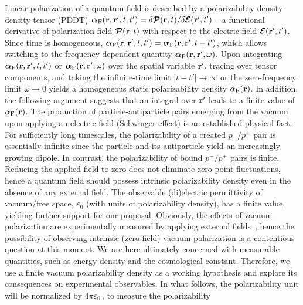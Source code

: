 \documentclass[aps,prl,twocolumn,showpacs,groupaddress]{revtex4-1}
\newcommand{\rrr}[1]{{\color{black}#1}}
\newcommand{\bbb}[1]{{\color{black}#1}}
\begin{document}
Linear polarization of a quantum field is described by a polarizability density-density tensor (PDDT) $\bm{\alpha}_{\rm F}({\bf r}, {\bf r'}, t, t') = \delta \bm{\mathcal{P}}({\bf r}, t) / \delta \bm{\mathcal{E}}({\bf r'}, t')$ -- a functional derivative of polarization field $\bm{\mathcal{P}}({\bf r},t)$ with respect to the electric field $\bm{\mathcal{E}}({\bf r'},t')$. 
\bbb{Since time is homogeneous, $\bm{\alpha}_{\rm F}({\bf r}, {\bf r'}, t, t') = \bm{\alpha}_{\rm F}({\bf r}, {\bf r'}, t-t')$, which allows switching to the frequency-dependent quantity $\bm{\alpha}_{\rm F}({\bf r}, {\bf r'}, \omega)$.}
Upon integrating $\bm{\alpha}_{\rm F}({\bf r}, {\bf r'}, t, t')$ \bbb{or $\bm{\alpha}_{\rm F}({\bf r}, {\bf r'}, \omega)$} over the spatial variable ${\bf r'}$, tracing over tensor components, and taking the infinite-time limit $|t-t'| \to \infty$ \bbb{or the zero-frequency limit $\omega \to 0$} yields a homogeneous static polarizability density $\alpha_{\rm F}({\bf r})$. 
In addition, the following argument suggests that an integral over ${\bf r'}$ leads to a finite value of $\alpha_{\rm F}({\bf r})$. 
\bbb{The production of particle-antiparticle pairs} emerging from the vacuum upon applying \bbb{an electric field \rrr{(Schwinger effect)} is} an established physical fact.
For sufficiently long timescales, the polarizability of \bbb{a created} $p^-/p^+$ pair is essentially infinite since the particle and its antiparticle yield an increasingly growing dipole.
\bbb{In contrast, the polarizability \bbb{of bound $p^-/p^+$ pairs is finite.}}
\rrr{Reducing} the applied field to zero does not eliminate zero-point fluctuations, hence a quantum field should possess intrinsic polarizability density even in the absence of any external field. The observable (di)electric permittivity of vacuum/free space,
$\varepsilon_0$ (with units of polarizability density), has a finite value, 
yielding further support for our proposal.
Obviously, the effects of vacuum polarization are experimentally \bbb{measured by applying} external fields~\cite{ScienceVacPol,Moskalenko2019,BeneaChelmus2019}, hence the possibility of observing intrinsic \bbb{(zero-field)} vacuum polarization is \bbb{a contentious question} at this moment. We are here ultimately concerned with measurable quantities, such as energy density and the cosmological constant. Therefore, we use a finite vacuum polarizability density as a working hypothesis and explore its consequences on experimental observables. In what follows, the polarizability unit will be normalized by $4\pi\varepsilon_0\,$, to measure the polarizability 
\end{document}
